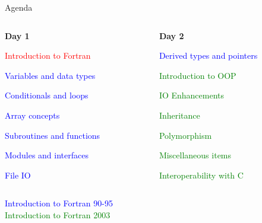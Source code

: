 \documentclass[11pt]{beamer}
\begin{document}
\begin{frame}{Agenda}

\begin{columns}[onlytextwidth,t]
    \begin{column}{0.48\textwidth}
        \textbf{Day 1}

    \begin{itemize}
        \item \textcolor{red}{Introduction to Fortran}
        \item \textcolor{blue}{Variables and data types
        \item Conditionals and loops
        \item Array concepts
        \item Subroutines and functions
        \item Modules and interfaces
        \item File IO}
    \end{itemize}
  \end{column}
  \begin{column}{0.48\textwidth}
    \textbf{Day 2}

    \begin{itemize}
        \item \textcolor{blue}{Derived types and pointers}
        \item \textcolor{green}{Introduction to OOP
        \item IO Enhancements
        \item Inheritance
        \item Polymorphism
        \item Miscellaneous items
        \item Interoperability with C}
    \end{itemize}
  \end{column}
\end{columns}

\begin{center}
\textcolor{blue}{Introduction to Fortran 90-95}\\
\textcolor{green}{Introduction to Fortran 2003}
\end{center}

\end{frame}

\end{document}
